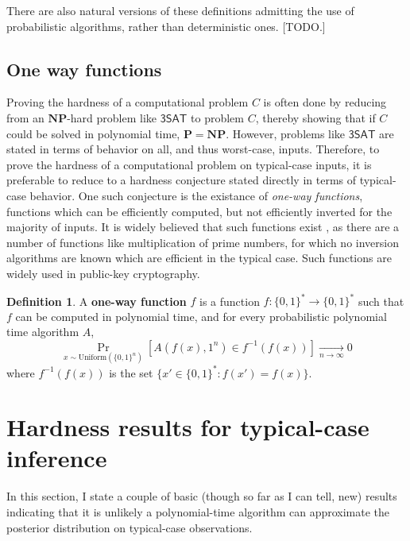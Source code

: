 \documentclass{article}
\renewcommand{\P}{\mathbf{P}}
\newcommand{\NP}{\mathbf{NP}}
\theoremstyle{definition}
\newtheorem{defn}{Definition}
\theoremstyle{remark}
\begin{document}

There are also natural versions of these definitions admitting the use of probabilistic algorithms, rather than deterministic ones. [TODO.]

\subsection{One way functions}
Proving the hardness of a computational problem $C$ is often done by reducing from an $\NP$-hard problem like $\mathsf{3SAT}$ to problem $C$, thereby showing that if $C$ could be solved in polynomial time, $\P = \NP$.
However, problems like $\mathsf{3SAT}$ are stated in terms of behavior on all, and thus worst-case, inputs.
Therefore, to prove the hardness of a computational problem on typical-case inputs, it is preferable to reduce to a hardness conjecture stated directly in terms of typical-case behavior.
One such conjecture is the existance of \textit{one-way functions}, functions which can be efficiently computed, but not efficiently inverted for the majority of inputs.
It is widely believed that such functions exist \cite{}, as there are a number of functions like multiplication of prime numbers, for which no inversion algorithms are known which are efficient in the typical case.
Such functions are widely used in public-key cryptography.

\begin{defn}
A \textbf{one-way function} $f$ is a function $f : \{0, 1\}^* \to \{0, 1\}^*$ such that $f$ can be computed in polynomial time, and for every probabilistic polynomial time algorithm $A$,
$$
\Pr_{x \sim \text{Uniform}(\{0, 1\}^n)}[A(f(x), 1^n) \in f^{-1}(f(x))] \underset{n \to \infty}{\to} 0
$$
where $f^{-1}(f(x))$ is the set $\{x' \in \{0, 1\}^* : f(x') = f(x)\}$.
\end{defn}

\section{Hardness results for typical-case inference}
In this section, I state a couple of basic (though so far as I can tell, new) results indicating that it is unlikely a polynomial-time algorithm can approximate the posterior distribution on typical-case observations.
\end{document}
